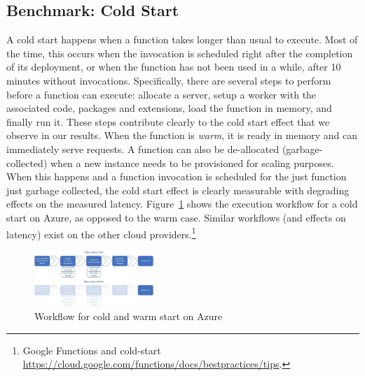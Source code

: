 
\subsection{Benchmark: Cold Start}
\label{sec:coldstart}
A cold start happens when a function takes longer than usual to execute. 
Most of the time, this occurs when the invocation is scheduled right after the completion of its deployment, or when the function has not been used in a while, \eg after 10 minutes without invocations.
Specifically, there are several steps to perform before a function can execute: allocate a server, setup a worker with the associated code, packages and extensions, load the function in memory, and finally run it.
These steps contribute clearly to the cold start effect that we observe in our results.
When the function is \emph{warm}, it is ready in memory and can immediately serve requests.
A function can also be de-allocated (\ie garbage-collected) when a new instance needs to be provisioned for scaling purposes. 
When this happens and a function invocation is scheduled for the just function just garbage collected, the cold start effect is clearly measurable with degrading effects on the measured latency.
Figure~\ref{fig:azure_coldstart} shows the execution workflow for a cold start on Azure, as opposed to the warm case. 
Similar workflows (and effects on latency) exist on the other cloud providers.\footnote{Google Functions and cold-start \url{https://cloud.google.com/functions/docs/bestpractices/tips}.}

\begin{figure}[!t]
\centering
\includegraphics[width=0.4\textwidth]{bilder/azure-coldstart.jpeg}
\caption{Workflow for cold and warm start on Azure~\cite{AzureColdStart}}
\label{fig:azure_coldstart}
\end{figure}


